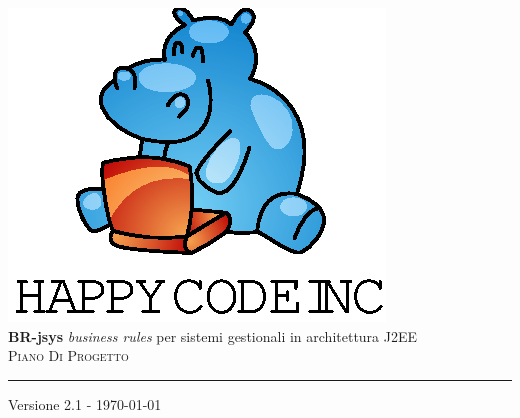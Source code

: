 \documentclass[11pt,titlepage,a4paper]{report}
\begin{document}
\newcommand{\lv}{ 2.1 } %
\newcommand{\dt}{ Piano Di Progetto }%
\newcommand{\Glossario}{ Glossario.1.7.pdf }

\begin{titlepage}\begin{center}

\vspace*{0.5in}
\includegraphics{logo.eps}
\vspace*{0.2in} \\
{\Large \textbf{BR-jsys}}
{\Large \emph{business rules} per sistemi gestionali in architettura J2EE } 
\vspace{2in} \\
\Huge \textsc{ \dt }
\par\rule{10cm}{0.4pt} \par {\large Versione \lv - \today} \\
\end{center}\end{titlepage}
\vspace*{0.5in}
\end{document}
